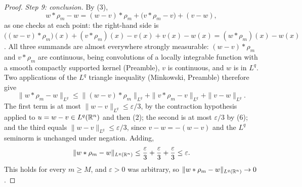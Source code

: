 \begin{proof}
\emph{Step 9: conclusion.}  By (3),
\[
w*\rho_m-w=(w-v)*\rho_m+\bigl(v*\rho_m-v\bigr)+(v-w),
\]
as one checks at each point: the right-hand side is
$\bigl((w-v)*\rho_m\bigr)(x)+(v*\rho_m)(x)-v(x)+v(x)-w(x)
=(w*\rho_m)(x)-w(x)$.  All three summands are almost everywhere strongly
measurable: $(w-v)*\rho_m$ and $v*\rho_m$ are continuous, being convolutions of
a locally integrable function with a smooth compactly supported kernel
(Preamble), $v$ is continuous, and $w$ is in $L^q$.  Two applications of the
$L^q$ triangle inequality (Minkowski, Preamble) therefore give
\[
\|w*\rho_m-w\|_{L^q}
\le\|(w-v)*\rho_m\|_{L^q}+\|v*\rho_m-v\|_{L^q}+\|v-w\|_{L^q} .
\]
The first term is at most $\|w-v\|_{L^q}\le\varepsilon/3$, by the contraction
hypothesis applied to $u=w-v\in L^q(\mathbb{R}^n)$ and then (2); the second is at most
$\varepsilon/3$ by (6); and the third equals $\|w-v\|_{L^q}\le\varepsilon/3$,
since $v-w=-(w-v)$ and the $L^q$ seminorm is unchanged under negation.  Adding,
\[
\|w*\rho_m-w\|_{L^q(\mathbb{R}^n)}
\le\frac\varepsilon3+\frac\varepsilon3+\frac\varepsilon3\le\varepsilon .
\]
This holds for every $m\ge M$, and $\varepsilon>0$ was arbitrary, so
$\|w*\rho_m-w\|_{L^q(\mathbb{R}^n)}\to0$.
\end{proof}
